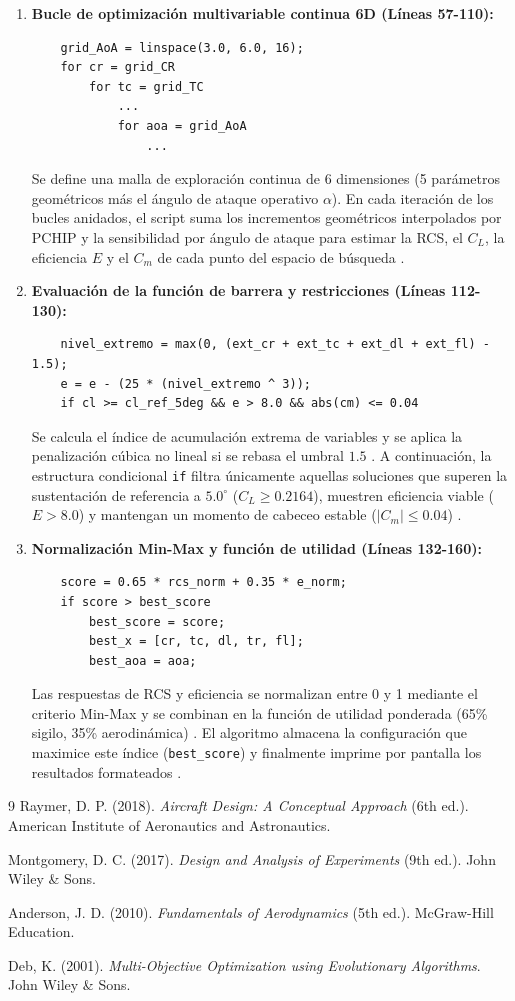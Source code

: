 \documentclass[11pt, a4paper]{article}
\begin{document}
\begin{enumerate}
    \item \textbf{Bucle de optimización multivariable continua 6D (Líneas 57-110):}
    \begin{lstlisting}
    grid_AoA = linspace(3.0, 6.0, 16);
    for cr = grid_CR
        for tc = grid_TC
            ...
            for aoa = grid_AoA
                ...
    \end{lstlisting}
    Se define una malla de exploración continua de 6 dimensiones (5 parámetros geométricos más el ángulo de ataque operativo $\alpha$). En cada iteración de los bucles anidados, el script suma los incrementos geométricos interpolados por PCHIP y la sensibilidad por ángulo de ataque para estimar la RCS, el $C_L$, la eficiencia $E$ y el $C_m$ de cada punto del espacio de búsqueda \cite{montgomery, anderson}.

    \item \textbf{Evaluación de la función de barrera y restricciones (Líneas 112-130):}
    \begin{lstlisting}
    nivel_extremo = max(0, (ext_cr + ext_tc + ext_dl + ext_fl) - 1.5);
    e = e - (25 * (nivel_extremo ^ 3));
    if cl >= cl_ref_5deg && e > 8.0 && abs(cm) <= 0.04
    \end{lstlisting}
    Se calcula el índice de acumulación extrema de variables y se aplica la penalización cúbica no lineal si se rebasa el umbral $1.5$ \cite{anderson}. A continuación, la estructura condicional \texttt{if} filtra únicamente aquellas soluciones que superen la sustentación de referencia a $5.0^\circ$ ($C_L \ge 0.2164$), muestren eficiencia viable ($E > 8.0$) y mantengan un momento de cabeceo estable ($\vert C_m \vert \le 0.04$) \cite{anderson}.

    \item \textbf{Normalización Min-Max y función de utilidad (Líneas 132-160):}
    \begin{lstlisting}
    score = 0.65 * rcs_norm + 0.35 * e_norm;
    if score > best_score
        best_score = score;
        best_x = [cr, tc, dl, tr, fl];
        best_aoa = aoa;
    \end{lstlisting}
    Las respuestas de RCS y eficiencia se normalizan entre 0 y 1 mediante el criterio Min-Max y se combinan en la función de utilidad ponderada (65\% sigilo, 35\% aerodinámica) \cite{deb}. El algoritmo almacena la configuración que maximice este índice (\texttt{best\_score}) y finalmente imprime por pantalla los resultados formateados \cite{anderson}.
\end{enumerate}

\begin{thebibliography}{9}
Raymer, D. P. (2018). \textit{Aircraft Design: A Conceptual Approach} (6th ed.). American Institute of Aeronautics and Astronautics. 

Montgomery, D. C. (2017). \textit{Design and Analysis of Experiments} (9th ed.). John Wiley \& Sons. 

Anderson, J. D. (2010). \textit{Fundamentals of Aerodynamics} (5th ed.). McGraw-Hill Education. 

Deb, K. (2001). \textit{Multi-Objective Optimization using Evolutionary Algorithms}. John Wiley \& Sons. 
\end{thebibliography}
\end{document}
